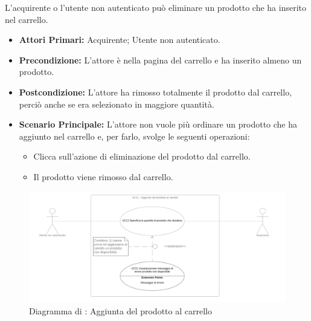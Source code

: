 \resetSubUC

L'acquirente o l'utente non autenticato può eliminare un prodotto che ha inserito nel carrello.
\begin{itemize}
    \item \textbf{Attori Primari:} Acquirente; Utente non autenticato.
    \item \textbf{Precondizione:} L'attore è nella pagina del carrello e ha inserito almeno un prodotto.
    \item \textbf{Postcondizione:} L'attore ha rimosso totalmente il prodotto dal carrello, perciò anche se era selezionato in maggiore quantità.
    \item \textbf{Scenario Principale:} L'attore non vuole più ordinare un prodotto che ha aggiunto nel carrello e, per farlo, svolge le seguenti operazioni:
    \begin{itemize}
        \item Clicca sull'azione di eliminazione del prodotto dal carrello.
        \item Il prodotto viene rimosso dal carrello.
    \end{itemize}
\end{itemize}

\begin{figure}[H]
    \centering
    \includegraphics[width=\textwidth]{Immagini/DiagrammiUC/UC11AggiuntaProdottoAlCarrello.png}
    \caption{Diagramma di \actualUC: Aggiunta del prodotto al carrello} 
    \label{fig:Checkout}
\end{figure}



